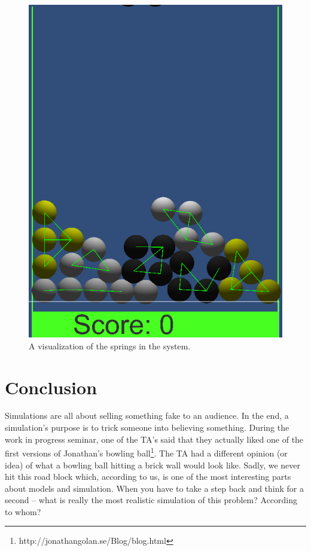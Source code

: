 \documentclass[11pt]{article} %
\begin{document}
\begin{figure}[h!]
	\centering
	\includegraphics[scale=0.36]{gizmos}
	\caption{A visualization of the springs in the system.}
\end{figure}

\section{Conclusion}
Simulations are all about selling something fake to an audience. In the end, a simulation's purpose is to trick someone into believing something. During the work in progress seminar, one of the TA's said that they actually liked one of the first versions of Jonathan's bowling ball\footnote{http://jonathangolan.se/Blog/blog.html}. The TA had a different opinion (or idea) of what a bowling ball hitting a brick wall would look like. Sadly, we never hit this road block which, according to us, is one of the most interesting parts about models and simulation. When you have to take a step back and think for a second -- what is really the most realistic simulation of this problem? According to whom?
\end{document}
